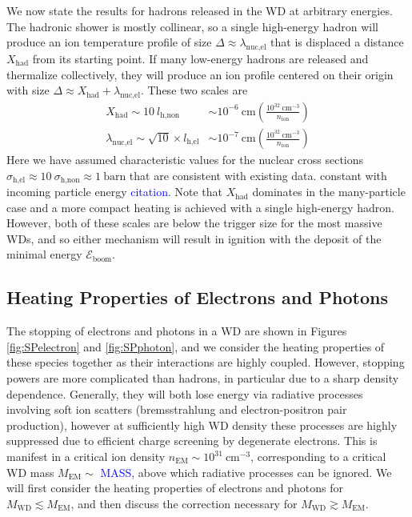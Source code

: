 \documentclass[twocolumn,showpacs,preprintnumbers,amsmath,amssymb,prd]{revtex4}
\newcommand{\Eboom}{\mathcal{E}_\text{boom}}
\def\r{\right)}
\def\l{\left(}
\begin{document}
We now state the results for hadrons released in the WD at arbitrary energies. The hadronic shower is mostly collinear, so a single high-energy hadron will produce an ion temperature profile of size $\Delta \approx\lambda_\text{nuc,el}$ that is displaced a distance $X_\text{had}$ from its starting point. 
If many low-energy hadrons are released and thermalize collectively, they will produce an ion profile centered on their origin with size $\Delta \approx X_\text{had} + \lambda_\text{nuc,el}$.
These two scales are
\begin{align}
  X_\text{had} \sim 10 ~l_\text{h,non}
  &\sim 10^{-6} ~\text{cm} \l\frac{10^{32}~\text{cm}^{-3}}{n_\text{ion}}\r \\ 
  \lambda_\text{nuc,el} \sim \sqrt{10} \times l_\text{h,el}  
  &\sim  10^{-7} ~\text{cm} \l\frac{10^{32}~\text{cm}^{-3}}{n_\text{ion}}\r
\end{align}
Here we have assumed characteristic values for the nuclear cross sections $\sigma_\text{h,el} \approx 10~\sigma_\text{h,non} \approx 1~\text{barn}$ that are consistent with existing data. constant with incoming particle energy \textcolor{blue}{citation}.
Note that $X_\text{had}$ dominates in the many-particle case and a more compact heating is achieved with a single high-energy hadron. 
However, both of these scales are below the trigger size for the most massive WDs, and so either mechanism will result in ignition with the deposit of the minimal energy $\Eboom$. 



\subsection{Heating Properties of Electrons and Photons}

The stopping of electrons and photons in a WD are shown in Figures \ref{fig:SPelectron} and \ref{fig:SPphoton}, and we consider the heating properties of these species together as their interactions are highly coupled.  
However, stopping powers are more complicated than hadrons, in particular due to a sharp density dependence. 
Generally, they will both lose energy via radiative processes involving soft ion scatters (bremsstrahlung and electron-positron pair production), however at sufficiently high WD density these processes are highly suppressed due to efficient charge screening by degenerate electrons.  
This is manifest in a critical ion density $n_\text{EM} \sim 10^{31} ~\text{cm}^{-3}$, corresponding to a critical WD mass $M_\text{EM} \sim $ \textcolor{blue}{MASS}, above which radiative processes can be ignored. 
We will first consider the heating properties of electrons and photons for $M_\text{WD} \lesssim M_\text{EM}$, and then discuss the correction necessary for $M_\text{WD} \gtrsim M_\text{EM}$.
 
\end{document}
